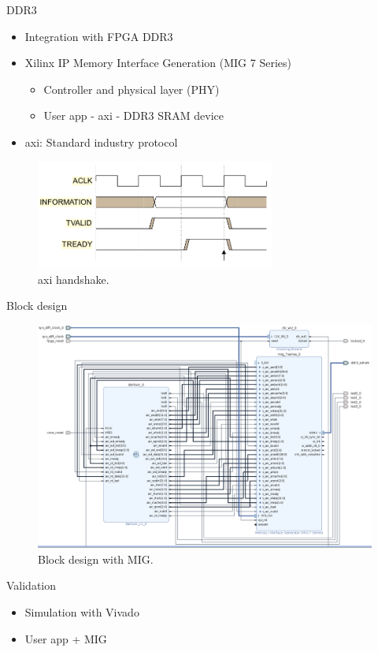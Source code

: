\begin{frame}{DDR3}
    \begin{itemize}
        \item Integration with FPGA DDR3
        \item Xilinx IP Memory Interface Generation (MIG 7 Series)
    \begin{itemize}
        \item Controller and physical layer (PHY)
        \item User app - \gls{axi} - DDR3 SRAM device
    \end{itemize}
        \item \gls{axi}: Standard industry protocol
    \end{itemize}
    \begin{figure}
        \centering
        \includegraphics[width=0.7\textwidth]{images/axi.png}
        \caption{\gls{axi} handshake.}
    \end{figure}
\end{frame}


\begin{frame}{Block design}
    \begin{figure}
        \centering
        \includegraphics[width=1.0\textwidth]{images/bd_ddr.png}
        \caption{Block design with MIG.}
    \end{figure}
\end{frame}

\begin{frame}{Validation}
    \begin{itemize}
        \item Simulation with Vivado
        \item User app + MIG
        
    \end{itemize}
\end{frame}

